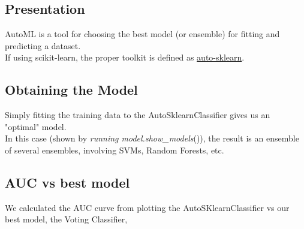 \subsection{Presentation}
AutoML is a tool for choosing the best model (or ensemble) for fitting and predicting a dataset.\\
If using scikit-learn, the proper toolkit is defined as \href{https://automl.github.io/auto-sklearn/}{auto-sklearn}.

\subsection{Obtaining the Model}
Simply fitting the training data to the AutoSklearnClassifier gives us an "optimal" model.\\
In this case (shown by \emph{running model.show\_models}()), the result is an ensemble of several ensembles, involving SVMs, Random Forests, etc.

\subsection{AUC vs best model}
We calculated the AUC curve from plotting the AutoSKlearnClassifier vs our best model, the Voting Classifier, 